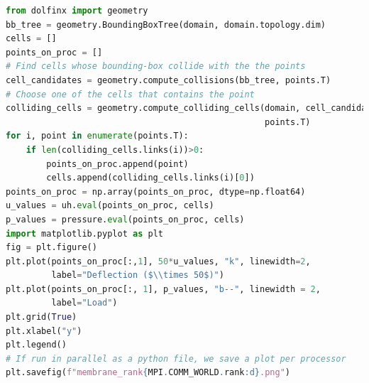 \begin{appendices}
\begin{lstlisting}[language=Python, caption={Extract from Deflection of a Membrane}]
from dolfinx import geometry
bb_tree = geometry.BoundingBoxTree(domain, domain.topology.dim)
cells = []
points_on_proc = []
# Find cells whose bounding-box collide with the the points
cell_candidates = geometry.compute_collisions(bb_tree, points.T)
# Choose one of the cells that contains the point
colliding_cells = geometry.compute_colliding_cells(domain, cell_candidates, 
                                                   points.T)
for i, point in enumerate(points.T):
    if len(colliding_cells.links(i))>0:
        points_on_proc.append(point)
        cells.append(colliding_cells.links(i)[0])
points_on_proc = np.array(points_on_proc, dtype=np.float64)
u_values = uh.eval(points_on_proc, cells)
p_values = pressure.eval(points_on_proc, cells)
import matplotlib.pyplot as plt
fig = plt.figure()
plt.plot(points_on_proc[:,1], 50*u_values, "k", linewidth=2, 
         label="Deflection ($\\times 50$)")
plt.plot(points_on_proc[:, 1], p_values, "b--", linewidth = 2, 
         label="Load")
plt.grid(True)
plt.xlabel("y")
plt.legend()
# If run in parallel as a python file, we save a plot per processor
plt.savefig(f"membrane_rank{MPI.COMM_WORLD.rank:d}.png")
\end{lstlisting}
%
%


\end{appendices}
